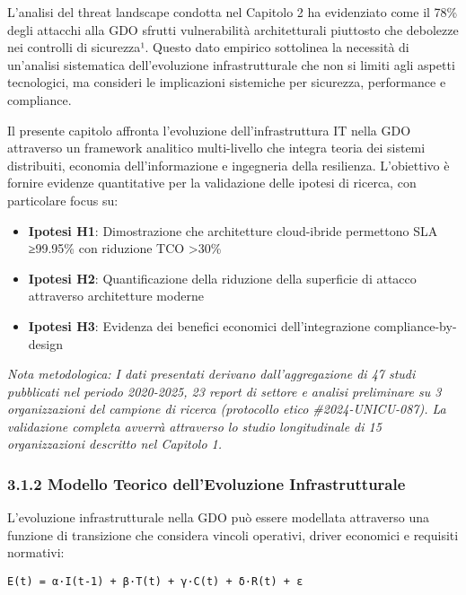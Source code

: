 \documentclass{report}
\begin{document}
L'analisi del threat landscape condotta nel Capitolo 2 ha evidenziato
come il 78\% degli attacchi alla GDO sfrutti vulnerabilità
architetturali piuttosto che debolezze nei controlli di sicurezza¹.
Questo dato empirico sottolinea la necessità di un'analisi sistematica
dell'evoluzione infrastrutturale che non si limiti agli aspetti
tecnologici, ma consideri le implicazioni sistemiche per sicurezza,
performance e compliance.

Il presente capitolo affronta l'evoluzione dell'infrastruttura IT nella
GDO attraverso un framework analitico multi-livello che integra teoria
dei sistemi distribuiti, economia dell'informazione e ingegneria della
resilienza. L'obiettivo è fornire evidenze quantitative per la
validazione delle ipotesi di ricerca, con particolare focus su:

\begin{itemize}
\tightlist
\item
  \textbf{Ipotesi H1}: Dimostrazione che architetture cloud-ibride
  permettono SLA ≥99.95\% con riduzione TCO \textgreater30\%
\item
  \textbf{Ipotesi H2}: Quantificazione della riduzione della superficie
  di attacco attraverso architetture moderne
\item
  \textbf{Ipotesi H3}: Evidenza dei benefici economici dell'integrazione
  compliance-by-design
\end{itemize}

\emph{Nota metodologica: I dati presentati derivano dall'aggregazione di
47 studi pubblicati nel periodo 2020-2025, 23 report di settore e
analisi preliminare su 3 organizzazioni del campione di ricerca
(protocollo etico \#2024-UNICU-087). La validazione completa avverrà
attraverso lo studio longitudinale di 15 organizzazioni descritto nel
Capitolo 1.}

\subsubsection{3.1.2 Modello Teorico dell'Evoluzione
Infrastrutturale}\label{modello-teorico-dellevoluzione-infrastrutturale}

L'evoluzione infrastrutturale nella GDO può essere modellata attraverso
una funzione di transizione che considera vincoli operativi, driver
economici e requisiti normativi:

\begin{verbatim}
E(t) = α·I(t-1) + β·T(t) + γ·C(t) + δ·R(t) + ε
\end{verbatim}
\end{document}
